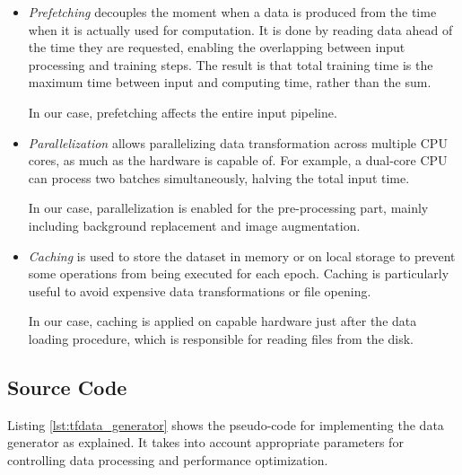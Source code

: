\begin{itemize}
    \item \textit{Prefetching} decouples the moment when a data is produced from the time when it is actually used for computation. It is done by reading data ahead of the time they are requested, enabling the overlapping between input processing and training steps. The result is that total training time is the maximum time between input and computing time, rather than the sum.
    
    In our case, prefetching affects the entire input pipeline.
    
    \item \textit{Parallelization} allows parallelizing data transformation across multiple CPU cores, as much as the hardware is capable of. For example, a dual-core CPU can process two batches simultaneously, halving the total input time. 
    
    In our case, parallelization is enabled for the pre-processing part, mainly including background replacement and image augmentation.
    
    \item \textit{Caching} is used to store the dataset in memory or on local storage to prevent some operations from being executed for each epoch. Caching is particularly useful to avoid expensive data transformations or file opening.
    
    In our case, caching is applied on capable hardware just after the data loading procedure, which is responsible for reading files from the disk.
\end{itemize}




\clearpage
\subsection{Source Code}
\label{subsec:data-generator-code}

Listing \ref{lst:tfdata_generator} shows the pseudo-code for implementing the data generator as explained. It takes into account appropriate parameters for controlling data processing and performance optimization.

